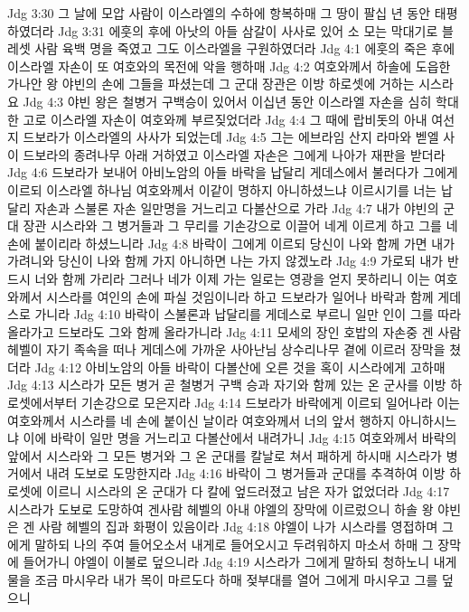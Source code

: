 Jdg 3:30  그 날에 모압 사람이 이스라엘의 수하에 항복하매 그 땅이 팔십 년 동안 태평하였더라
Jdg 3:31  에훗의 후에 아낫의 아들 삼갈이 사사로 있어 소 모는 막대기로 블레셋 사람 육백 명을 죽였고 그도 이스라엘을 구원하였더라
Jdg 4:1  에훗의 죽은 후에 이스라엘 자손이 또 여호와의 목전에 악을 행하매
Jdg 4:2  여호와께서 하솔에 도읍한 가나안 왕 야빈의 손에 그들을 파셨는데 그 군대 장관은 이방 하로셋에 거하는 시스라요
Jdg 4:3  야빈 왕은 철병거 구백승이 있어서 이십년 동안 이스라엘 자손을 심히 학대한 고로 이스라엘 자손이 여호와께 부르짖었더라
Jdg 4:4  그 때에 랍비돗의 아내 여선지 드보라가 이스라엘의 사사가 되었는데
Jdg 4:5  그는 에브라임 산지 라마와 벧엘 사이 드보라의 종려나무 아래 거하였고 이스라엘 자손은 그에게 나아가 재판을 받더라
Jdg 4:6  드보라가 보내어 아비노암의 아들 바락을 납달리 게데스에서 불러다가 그에게 이르되 이스라엘 하나님 여호와께서 이같이 명하지 아니하셨느냐 이르시기를 너는 납달리 자손과 스불론 자손 일만명을 거느리고 다볼산으로 가라
Jdg 4:7  내가 야빈의 군대 장관 시스라와 그 병거들과 그 무리를 기손강으로 이끌어 네게 이르게 하고 그를 네 손에 붙이리라 하셨느니라
Jdg 4:8  바락이 그에게 이르되 당신이 나와 함께 가면 내가 가려니와 당신이 나와 함께 가지 아니하면 나는 가지 않겠노라
Jdg 4:9  가로되 내가 반드시 너와 함께 가리라 그러나 네가 이제 가는 일로는 영광을 얻지 못하리니 이는 여호와께서 시스라를 여인의 손에 파실 것임이니라 하고 드보라가 일어나 바락과 함께 게데스로 가니라
Jdg 4:10  바락이 스불론과 납달리를 게데스로 부르니 일만 인이 그를 따라 올라가고 드보라도 그와 함께 올라가니라
Jdg 4:11  모세의 장인 호밥의 자손중 겐 사람 헤벨이 자기 족속을 떠나 게데스에 가까운 사아난님 상수리나무 곁에 이르러 장막을 쳤더라
Jdg 4:12  아비노암의 아들 바락이 다볼산에 오른 것을 혹이 시스라에게 고하매
Jdg 4:13  시스라가 모든 병거 곧 철병거 구백 승과 자기와 함께 있는 온 군사를 이방 하로셋에서부터 기손강으로 모은지라
Jdg 4:14  드보라가 바락에게 이르되 일어나라 이는 여호와께서 시스라를 네 손에 붙이신 날이라 여호와께서 너의 앞서 행하지 아니하시느냐 이에 바락이 일만 명을 거느리고 다볼산에서 내려가니
Jdg 4:15  여호와께서 바락의 앞에서 시스라와 그 모든 병거와 그 온 군대를 칼날로 쳐서 패하게 하시매 시스라가 병거에서 내려 도보로 도망한지라
Jdg 4:16  바락이 그 병거들과 군대를 추격하여 이방 하로셋에 이르니 시스라의 온 군대가 다 칼에 엎드러졌고 남은 자가 없었더라
Jdg 4:17  시스라가 도보로 도망하여 겐사람 헤벨의 아내 야엘의 장막에 이르렀으니 하솔 왕 야빈은 겐 사람 헤벨의 집과 화평이 있음이라
Jdg 4:18  야엘이 나가 시스라를 영접하며 그에게 말하되 나의 주여 들어오소서 내게로 들어오시고 두려워하지 마소서 하매 그 장막에 들어가니 야엘이 이불로 덮으니라
Jdg 4:19  시스라가 그에게 말하되 청하노니 내게 물을 조금 마시우라 내가 목이 마르도다 하매 젖부대를 열어 그에게 마시우고 그를 덮으니
